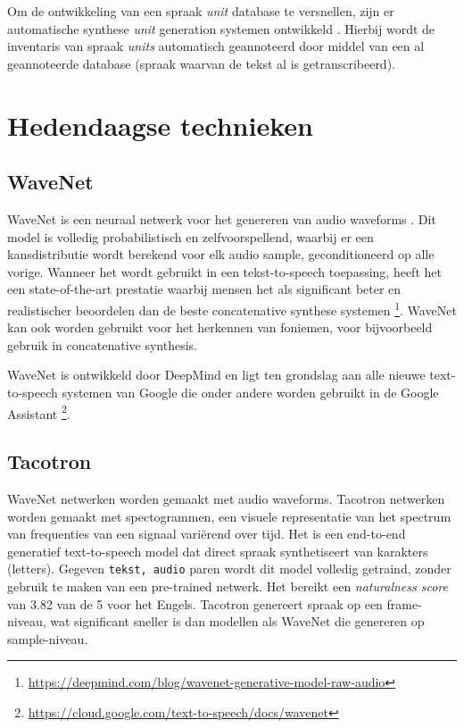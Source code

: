 Om de ontwikkeling van een spraak \textit{unit} database te versnellen, zijn er automatische synthese \textit{unit} generation systemen ontwikkeld \cite{nakajima1994automatic}. Hierbij wordt de inventaris van spraak \textit{units} automatisch geannoteerd door middel van een al geannoteerde database (spraak waarvan de tekst al is getranscribeerd).


\section{Hedendaagse technieken}

\subsection{WaveNet}
WaveNet is een neuraal netwerk voor het genereren van audio waveforms \cite{45774}. Dit model is volledig probabilistisch en zelfvoorspellend, waarbij er een kansdistributie wordt berekend voor elk audio sample, geconditioneerd op alle vorige. Wanneer het wordt gebruikt in een tekst-to-speech toepassing, heeft het een state-of-the-art prestatie waarbij mensen het als significant beter en realistischer beoordelen dan de beste concatenative synthese systemen \footnote{\url{https://deepmind.com/blog/wavenet-generative-model-raw-audio}}. WaveNet kan ook worden gebruikt voor het herkennen van foniemen, voor bijvoorbeeld gebruik in concatenative synthesis.

WaveNet is ontwikkeld door DeepMind en ligt ten grondslag aan alle nieuwe text-to-speech systemen van Google die onder andere worden gebruikt in de Google Assistant \footnote{\url{https://cloud.google.com/text-to-speech/docs/wavenet}}.


\subsection{Tacotron}
WaveNet netwerken worden gemaakt met audio waveforms. Tacotron\cite{Wang2017TacotronTE} netwerken worden gemaakt met spectogrammen, een visuele representatie van het spectrum van frequenties van een signaal variërend over tijd. Het is een end-to-end generatief text-to-speech model dat direct spraak synthetiseert van karakters (letters). Gegeven \texttt{tekst, audio} paren wordt dit model volledig getraind, zonder gebruik te maken van een pre-trained netwerk. Het bereikt een \textit{naturalness score} van 3.82 van de 5 voor het Engels. Tacotron genereert spraak op een frame-niveau, wat significant sneller is dan modellen als WaveNet die genereren op sample-niveau. 

